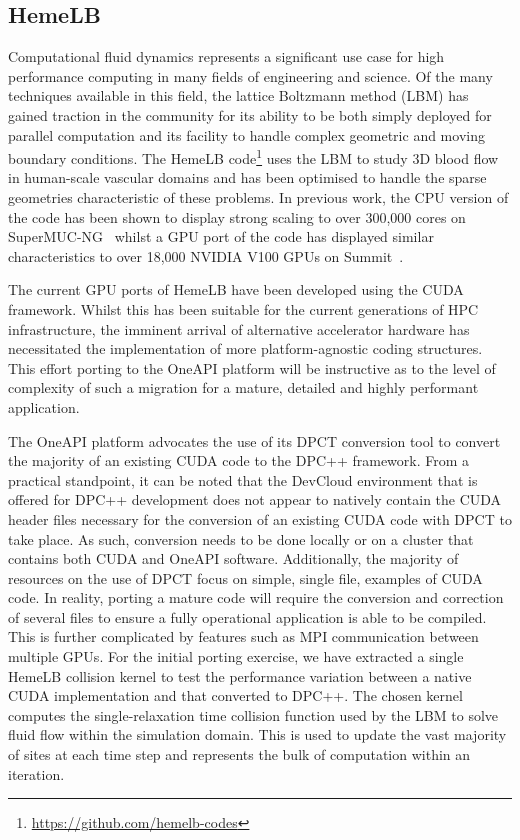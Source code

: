 \documentclass[../main]{subfiles}
\begin{document}
\subsection{HemeLB}\label{sec:hemelb}

Computational fluid dynamics represents a significant use case for high performance computing in many fields of engineering and science.
Of the many techniques available in this field, the lattice Boltzmann method (LBM) has gained traction in the community for its ability to be both simply deployed for parallel computation and its facility to handle complex geometric and moving boundary conditions.
The HemeLB code\footnote{\url{https://github.com/hemelb-codes}} uses the LBM to study 3D blood flow in human-scale vascular domains and has been optimised to handle the sparse geometries characteristic of these problems.
In previous work, the CPU version of the code has been shown to display strong scaling to over 300,000 cores on SuperMUC-NG~\cite{mccullough2021towards} whilst a GPU port of the code has displayed similar characteristics to over 18,000 NVIDIA V100 GPUs on Summit~\cite{zacharoudiou_development_2022}.

The current GPU ports of HemeLB have been developed using the CUDA framework.
Whilst this has been suitable for the current generations of HPC infrastructure, the imminent arrival of alternative accelerator hardware has necessitated the implementation of more platform-agnostic coding structures.
This effort porting to the OneAPI platform will be instructive as to the level of complexity of such a migration for a mature, detailed and highly performant application.

The OneAPI platform advocates the use of its DPCT conversion tool to convert the majority of an existing CUDA code to the DPC++ framework.
From a practical standpoint, it can be noted that the DevCloud environment that is offered for DPC++ development does not appear to natively contain the CUDA header files necessary for the conversion of an existing CUDA code with DPCT to take place.
As such, conversion needs to be done locally or on a cluster that contains both CUDA and OneAPI software.
Additionally, the majority of resources on the use of DPCT focus on simple, single file, examples of CUDA code.
In reality, porting a mature code will require the conversion and correction of several files to ensure a fully operational application is able to be compiled.
This is further complicated by features such as MPI communication between multiple GPUs.
For the initial porting exercise, we have extracted a single HemeLB collision kernel to test the performance variation between a native CUDA implementation and that converted to DPC++.
The chosen kernel computes the single-relaxation time collision function used by the LBM to solve fluid flow within the simulation domain.
This is used to update the vast majority of sites at each time step and represents the bulk of computation within an iteration.
\end{document}
